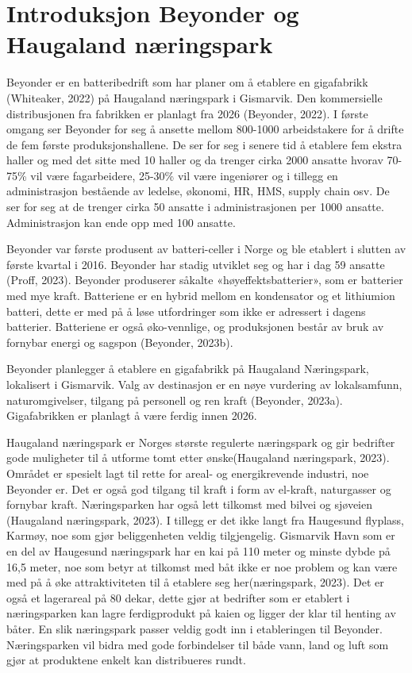 \documentclass[
]{article}
\begin{document}
\newpage

\hypertarget{introduksjon-beyonder-og-haugaland-nuxe6ringspark}{%
\section{Introduksjon Beyonder og Haugaland
næringspark}\label{introduksjon-beyonder-og-haugaland-nuxe6ringspark}}

Beyonder er en batteribedrift som har planer om å etablere en
gigafabrikk (Whiteaker, 2022) på Haugaland næringspark i Gismarvik. Den
kommersielle distribusjonen fra fabrikken er planlagt fra 2026
(Beyonder, 2022). I første omgang ser Beyonder for seg å ansette mellom
800-1000 arbeidstakere for å drifte de fem første produksjonshallene. De
ser for seg i senere tid å etablere fem ekstra haller og med det sitte
med 10 haller og da trenger cirka 2000 ansatte hvorav 70-75\% vil være
fagarbeidere, 25-30\% vil være ingeniører og i tillegg en administrasjon
bestående av ledelse, økonomi, HR, HMS, supply chain osv. De ser for seg
at de trenger cirka 50 ansatte i administrasjonen per 1000 ansatte.
Administrasjon kan ende opp med 100 ansatte.

Beyonder var første produsent av batteri-celler i Norge og ble etablert
i slutten av første kvartal i 2016. Beyonder har stadig utviklet seg og
har i dag 59 ansatte (Proff, 2023). Beyonder produserer såkalte
«høyeffektsbatterier», som er batterier med mye kraft. Batteriene er en
hybrid mellom en kondensator og et lithiumion batteri, dette er med på å
løse utfordringer som ikke er adressert i dagens batterier. Batteriene
er også øko-vennlige, og produksjonen består av bruk av fornybar energi
og sagspon (Beyonder, 2023b).

Beyonder planlegger å etablere en gigafabrikk på Haugaland Næringspark,
lokalisert i Gismarvik. Valg av destinasjon er en nøye vurdering av
lokalsamfunn, naturomgivelser, tilgang på personell og ren kraft
(Beyonder, 2023a). Gigafabrikken er planlagt å være ferdig innen 2026.

Haugaland næringspark er Norges største regulerte næringspark og gir
bedrifter gode muligheter til å utforme tomt etter ønske(Haugaland
næringspark, 2023). Området er spesielt lagt til rette for areal- og
energikrevende industri, noe Beyonder er. Det er også god tilgang til
kraft i form av el-kraft, naturgasser og fornybar kraft. Næringsparken
har også lett tilkomst med bilvei og sjøveien (Haugaland næringspark,
2023). I tillegg er det ikke langt fra Haugesund flyplass, Karmøy, noe
som gjør beliggenheten veldig tilgjengelig. Gismarvik Havn som er en del
av Haugesund næringspark har en kai på 110 meter og minste dybde på 16,5
meter, noe som betyr at tilkomst med båt ikke er noe problem og kan være
med på å øke attraktiviteten til å etablere seg her(næringspark, 2023).
Det er også et lagerareal på 80 dekar, dette gjør at bedrifter som er
etablert i næringsparken kan lagre ferdigprodukt på kaien og ligger der
klar til henting av båter. En slik næringspark passer veldig godt inn i
etableringen til Beyonder. Næringsparken vil bidra med gode forbindelser
til både vann, land og luft som gjør at produktene enkelt kan
distribueres rundt.
\end{document}
